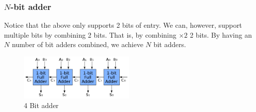 \documentclass[a4paper]{article}
\theoremstyle{plain}
\theoremstyle{definition}
\theoremstyle{remark}
\begin{document}
\subsubsection{$N$-bit adder}
Notice that the above only supports 2 bits of entry. We can, however, support multiple bits by combining 2 bits. That is, by combining $\times 2$ 2 bits. By having an $N$ number of bit adders combined, we achieve $N$ bit adders.
\begin{figure}[H]
	\centering
	\includegraphics[width=0.5\textwidth]{figures/4bit.png}
	\caption{4 Bit adder}
	\label{fig:figures-4bit-png}
\end{figure}	
\end{document}
